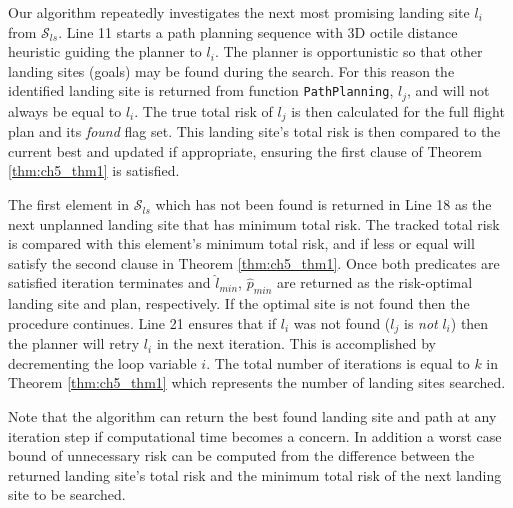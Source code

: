 Our algorithm repeatedly investigates the next most promising landing site $l_i$ from $\mathcal{S}_{ls}$. Line 11 starts a path planning sequence with 3D octile distance heuristic guiding the planner to $l_i$. The planner is opportunistic so that other landing sites (goals) may be found during the search.  For this reason the identified landing site is returned from function \texttt{PathPlanning}, $l_j$, and will not always be equal to $l_i$. The true total risk of $l_j$ is then calculated for the full flight plan and its \emph{found} flag set. This landing site's total risk is then compared to the current best and updated if appropriate, ensuring the first clause of Theorem \ref{thm:ch5_thm1} is satisfied.

The first element in $\mathcal{S}_{ls}$ which has not been found is returned in Line 18 as the next unplanned landing site that has minimum total risk. The tracked total risk is compared with this element's minimum total risk, and if less or equal will satisfy the second clause in Theorem \ref{thm:ch5_thm1}. Once both predicates are satisfied iteration terminates and $\hat{l}_{min}$, $\hat{p}_{min}$ are returned as the risk-optimal landing site and plan, respectively. 
If the optimal site is not found then the procedure continues. Line 21 ensures that if $l_i$ was not found ($l_j$ is \emph{not} $l_i$) then the planner will retry $l_i$ in the next iteration. This is accomplished by decrementing the loop variable $i$. The total number of iterations is equal to $k$ in Theorem \ref{thm:ch5_thm1} which represents the number of landing sites searched.

Note that the algorithm can return the best found landing site and path at any iteration step if computational time becomes a concern. In addition a worst case bound of unnecessary risk can be computed from the difference between the returned landing site's total risk and the minimum total risk of the next landing site to be searched.

%
\newcommand{\Float}{\KwSty{float}}
\newcommand{\Vecthree}{\KwSty{vec3f}}
\newcommand{\Boolean}{\KwSty{bool}}
\newcommand{\forcond}{$i=0$ \KwTo $n$}


